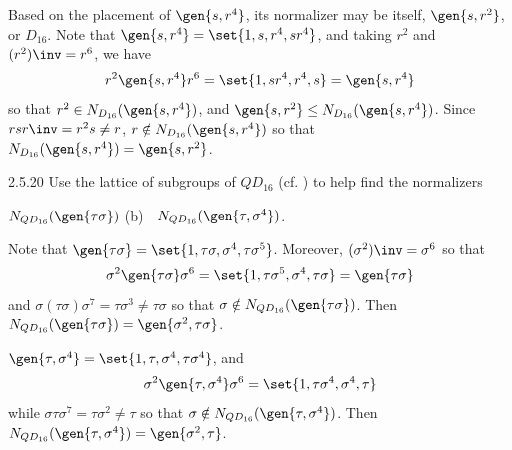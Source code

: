 \begin{sol}
    Based on the placement of $\gen{s, r^4}$, its normalizer may be itself, $\gen{s, r^2}$, or $D_{16}$.
	Note that $\gen{s, r^4} = \set{1, s, r^4, sr^4}$, and taking $r^2$ and $(r^2)\inv = r^6$, we have
    \[
    	r^2\gen{s, r^4}r^6 = \set{1, sr^4, r^4, s} = \gen{s, r^4}
    \]
    so that $r^2 \in N_{D_{16}}(\gen{s, r^4})$, and $\gen{s, r^2} \leq N_{D_{16}}(\gen{s, r^4})$.
	Since $rsr\inv = r^2s \neq r$, $r \notin N_{D_{16}}(\gen{s, r^4})$ so that $N_{D_{16}}(\gen{s, r^4}) = \gen{s, r^2}$.
\end{sol}

\begin{exercise}{2.5.20}
    Use the lattice of subgroups of $QD_{16}$ (cf. ) to help find the normalizers
    \begin{subexercises}
        \item $N_{QD_{16}}(\gen{\tau\sigma})$ \quad (b)~~$N_{QD_{16}}(\gen{\tau, \sigma^4})$.
    \end{subexercises}
\end{exercise}

\begin{solenum}
    \item Note that $\gen{\tau\sigma} = \set{1, \tau\sigma, \sigma^4, \tau\sigma^5}$.
	Moreover, $(\sigma^2)\inv = \sigma^6$ so that
    \[
    	\sigma^2\gen{\tau\sigma}\sigma^6 = \set{1, \tau\sigma^5, \sigma^4, \tau\sigma} = \gen{\tau\sigma}
    \]
    and $\sigma(\tau\sigma)\sigma^7 = \tau\sigma^3 \neq \tau\sigma$ so that $\sigma \notin N_{QD_{16}}(\gen{\tau\sigma})$.
	Then $N_{QD_{16}}(\gen{\tau\sigma}) = \gen{\sigma^2, \tau\sigma}$.
    \item $\gen{\tau, \sigma^4} = \set{1, \tau, \sigma^4, \tau\sigma^4}$, and 
    \[
    	\sigma^2\gen{\tau, \sigma^4}\sigma^6 = \set{1, \tau\sigma^4, \sigma^4, \tau}
    \]
    while $\sigma\tau\sigma^7 = \tau\sigma^2 \neq \tau$ so that $\sigma \notin N_{QD_{16}}(\gen{\tau, \sigma^4})$.
	Then $N_{QD_{16}}(\gen{\tau, \sigma^4}) = \gen{\sigma^2, \tau}$.
\end{solenum}